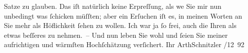                Satze zu glauben. Das iſt natürlich keine Erpreſſung, als we{\geminationn} Sie mir nun unbedingt
               was{ }ſchicken müſſten; aber ein Erſuchen iſt es, in meinen Worten an Sie mehr als
               Höflichkeit{ }ſehen zu wollen. Ich war ja{ }ſo frei, auch die Ihren als etwas
               beſſeres zu nehmen. – Und nun leben {\pb}Sie wohl und{ }ſeien Sie meiner aufrichtigen und
               wärmſten Hochſchätzung verſichert.\pend
           \pstart Ihr
               \spacefill\mbox{ArthSchnitzler}\pend{}
/12 92\pend
           \endnumbering{}  \newcommand{\dateiname}{L03942}\newcommand{\titel}{Arthur Schnitzler an Theodor Herzl, 30. 12. 1892}\newcommand{\editorInnen}{Herausgegeben von Jahnke, SelmaMüller, Martin Anton}
